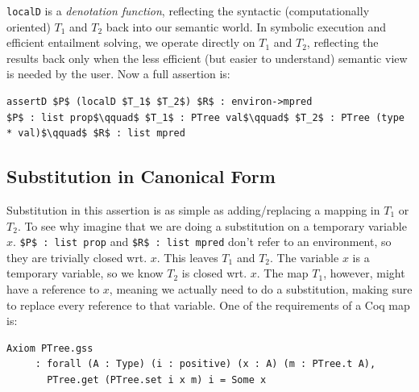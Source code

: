 \documentclass{puthesis}
\begin{document}
\lstinline{localD} is a \emph{denotation function}, reflecting the
syntactic (computationally oriented) $T_1$ and $T_2$ back into our
semantic world.  In symbolic execution and efficient entailment
solving, we operate directly on $T_1$ and $T_2$, reflecting the
results back only when the less efficient (but easier to understand)
semantic view is needed by the user. Now a full assertion is:

\begin{lstlisting}
assertD $P$ (localD $T_1$ $T_2$) $R$ : environ->mpred
$P$ : list prop$\qquad$ $T_1$ : PTree val$\qquad$ $T_2$ : PTree (type * val)$\qquad$ $R$ : list mpred
\end{lstlisting}

\subsection{Substitution in Canonical Form}

Substitution in this assertion is as simple as adding/replacing a
mapping in $T_1$ or $T_2$. To see why imagine that we are doing a
substitution on a temporary variable $x$.  \lstinline|$P$ : list prop|
and \lstinline|$R$ : list mpred| don't refer to an environment, so
they are trivially closed wrt.  $x$. This leaves $T_1$ and $T_2$. The
variable $x$ is a temporary variable, so we know $T_2$ is closed
wrt. $x$.  The map $T_1$, however, might have a reference to $x$,
meaning we actually need to do a substitution, making sure to replace
every reference to that variable. One of the requirements of a Coq map
is:

\begin{verbatim}
Axiom PTree.gss
     : forall (A : Type) (i : positive) (x : A) (m : PTree.t A),
       PTree.get (PTree.set i x m) i = Some x
\end{verbatim}
\end{document}
